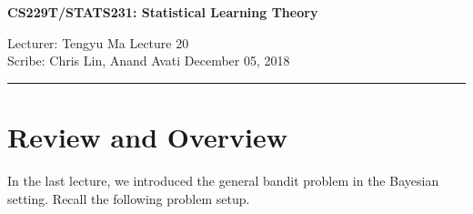 \documentclass[11pt]{article}
\newcommand{\draftnotice}{\vbox to 0.25in{\noindent
   \raisebox{0.6in}[0in][0in]{\makebox[\textwidth][r]{\it
    DRAFT --- a final version will be posted shortly}}}
   \vspace{-.25in}\vspace{-\baselineskip}
}
\begin{document}
\thispagestyle{empty}


\begin{center}
\bf\large CS229T/STATS231: Statistical Learning Theory
\end{center}

\noindent
Lecturer: Tengyu Ma   %
\hfill
Lecture 20               %
\\
Scribe: Chris Lin, Anand Avati       %
\hfill
December 05, 2018           %

\noindent
\rule{\textwidth}{1pt}

\medskip


\section{Review and Overview}

In the last lecture, we introduced the general bandit problem in the Bayesian setting. Recall the following problem setup.
\end{document}
